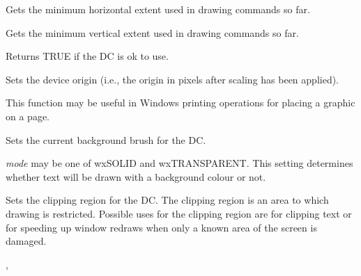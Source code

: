 \label{wxdcminx}


Gets the minimum horizontal extent used in drawing commands so far.

\label{wxdcminy}


Gets the minimum vertical extent used in drawing commands so far.

\label{wxdcok}


Returns TRUE if the DC is ok to use.

\label{wxdcsetdeviceorigin}


Sets the device origin (i.e., the origin in pixels after scaling has been
applied).

This function may be useful in Windows printing
operations for placing a graphic on a page.

\label{wxdcsetbackground}


Sets the current background brush for the DC.

\label{wxdcsetbackgroundmode}


{\it mode} may be one of wxSOLID and wxTRANSPARENT. This setting determines
whether text will be drawn with a background colour or not.

\label{wxdcsetclippingregion}



Sets the clipping region for the DC. The clipping region is an area
to which drawing is restricted. Possible uses for the clipping region are for clipping text
or for speeding up window redraws when only a known area of the screen is damaged.


, 

